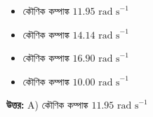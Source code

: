 \documentclass[12pt, a4paper]{article}
\begin{document}
\vspace{1em}

\begin{itemize}[label={}, leftmargin=1cm, itemsep=0.5em]
\item[\textbf{A)}] কৌণিক কম্পাঙ্ক $11.95\text{ rad s}^{-1}$
\item[\textbf{B)}] কৌণিক কম্পাঙ্ক $14.14\text{ rad s}^{-1}$
\item[\textbf{C)}] কৌণিক কম্পাঙ্ক $16.90\text{ rad s}^{-1}$
\item[\textbf{D)}] কৌণিক কম্পাঙ্ক $10.00\text{ rad s}^{-1}$
\end{itemize}

\vspace{0.5em}
\begin{tcolorbox}[answerbox]
\textbf{\color{success} উত্তর:} A) কৌণিক কম্পাঙ্ক $11.95\text{ rad s}^{-1}$
\end{tcolorbox}
\vspace{1em}
\end{document}
